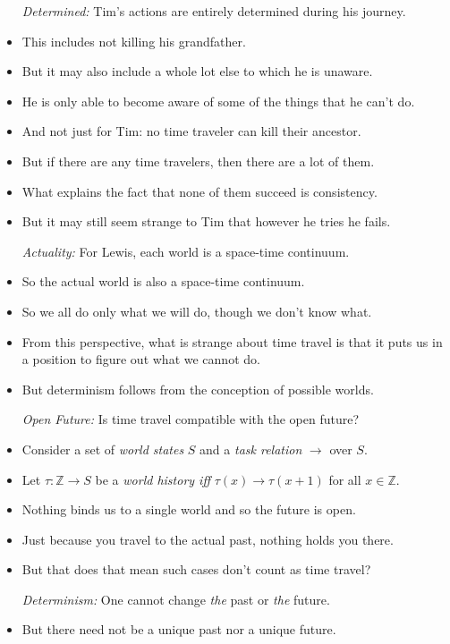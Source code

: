 \documentclass[a4paper, 11pt]{article} %
\newcommand{\tuple}[1]{\langle#1\rangle} %
\newcommand{\Z}{\mathbb{Z}}
\begin{document}
\begin{itemize}
  \item[\it Determined:] Tim's actions are entirely determined during his journey.
    \item This includes not killing his grandfather.
    \item But it may also include a whole lot else to which he is unaware.
    \item He is only able to become aware of some of the things that he can't do.
    \item And not just for Tim: no time traveler can kill their ancestor.
    \item But if there are any time travelers, then there are a lot of them.
    \item What explains the fact that none of them succeed is consistency.
    \item But it may still seem strange to Tim that however he tries he fails.
  \item[\it Actuality:] For Lewis, each world is a space-time continuum.
    \item So the actual world is also a space-time continuum.
    \item So we all do only what we will do, though we don't know what.
    \item From this perspective, what is strange about time travel is that it puts us in a position to figure out what we cannot do.
    \item But determinism follows from the conception of possible worlds.
  \item[\it Open Future:] Is time travel compatible with the open future?
    \item Consider a set of \textit{world states} $S$ and a \textit{task relation} $\to$ over $S$.
    \item Let $\tau : \Z \to S$ be a \textit{world history iff} $\tau(x) \to \tau(x+1)$ for all $x \in \Z$. 
    \item Nothing binds us to a single world and so the future is open.
    \item Just because you travel to the actual past, nothing holds you there.
    \item But that does that mean such cases don't count as time travel?
  \item[\it Determinism:] One cannot change \textit{the} past or \textit{the} future.
    \item But there need not be a unique past nor a unique future.
\end{itemize}
\end{document}
